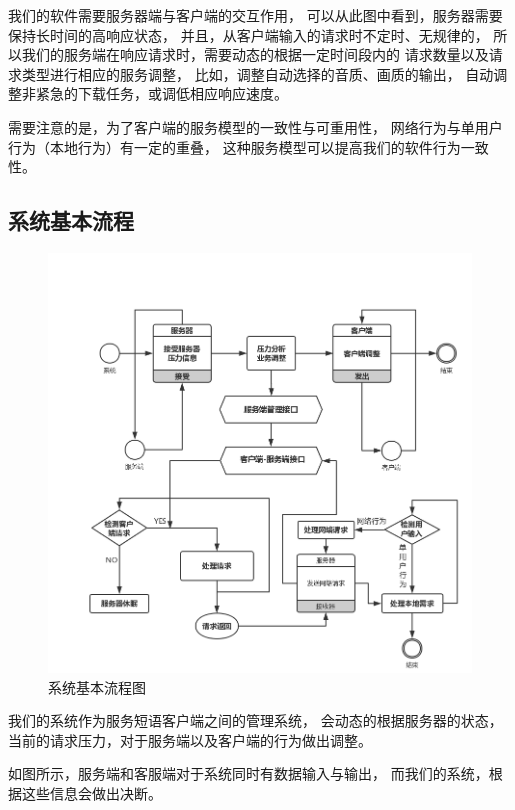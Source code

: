 我们的软件需要服务器端与客户端的交互作用，
可以从此图中看到，服务器需要保持长时间的高响应状态，
并且，从客户端输入的请求时不定时、无规律的，
所以我们的服务端在响应请求时，需要动态的根据一定时间段内的
请求数量以及请求类型进行相应的服务调整，
比如，调整自动选择的音质、画质的输出，
自动调整非紧急的下载任务，或调低相应响应速度。

需要注意的是，为了客户端的服务模型的一致性与可重用性，
网络行为与单用户行为（本地行为）有一定的重叠，
这种服务模型可以提高我们的软件行为一致性。

\newpage
\subsection{系统基本流程}
\begin{figure}[h!]
\centering
\includegraphics[width=15cm]{images/do_2}
\caption{系统基本流程图}
\end{figure}

我们的系统作为服务短语客户端之间的管理系统，
会动态的根据服务器的状态，
 当前的请求压力，对于服务端以及客户端的行为做出调整。

 如图所示，服务端和客服端对于系统同时有数据输入与输出，
 而我们的系统，根据这些信息会做出决断。

\newpage
